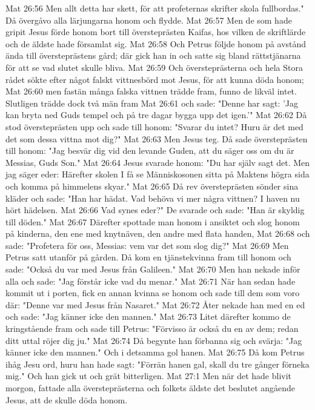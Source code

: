 Mat 26:56  Men allt detta har skett, för att profeternas skrifter skola fullbordas." Då övergåvo alla lärjungarna honom och flydde.
Mat 26:57  Men de som hade gripit Jesus förde honom bort till översteprästen Kaifas, hos vilken de skriftlärde och de äldste hade församlat sig.
Mat 26:58  Och Petrus följde honom på avstånd ända till översteprästens gård; där gick han in och satte sig bland rättstjänarna för att se vad slutet skulle bliva.
Mat 26:59  Och översteprästerna och hela Stora rådet sökte efter något falskt vittnesbörd mot Jesus, för att kunna döda honom;
Mat 26:60  men fastän många falska vittnen trädde fram, funno de likväl intet. Slutligen trädde dock två män fram
Mat 26:61  och sade: "Denne har sagt: 'Jag kan bryta ned Guds tempel och på tre dagar bygga upp det igen.'"
Mat 26:62  Då stod översteprästen upp och sade till honom: "Svarar du intet? Huru är det med det som dessa vittna mot dig?"
Mat 26:63  Men Jesus teg. Då sade översteprästen till honom: "Jag besvär dig vid den levande Guden, att du säger oss om du är Messias, Guds Son."
Mat 26:64  Jesus svarade honom: "Du har själv sagt det. Men jag säger eder: Härefter skolen I få se Människosonen sitta på Maktens högra sida och komma på himmelens skyar."
Mat 26:65  Då rev översteprästen sönder sina kläder och sade: "Han har hädat. Vad behöva vi mer några vittnen? I haven nu hört hädelsen.
Mat 26:66  Vad synes eder?" De svarade och sade: "Han är skyldig till döden."
Mat 26:67  Därefter spottade man honom i ansiktet och slog honom på kinderna, den ene med knytnäven, den andre med flata handen,
Mat 26:68  och sade: "Profetera för oss, Messias: vem var det som slog dig?"
Mat 26:69  Men Petrus satt utanför på gården. Då kom en tjänstekvinna fram till honom och sade: "Också du var med Jesus från Galileen."
Mat 26:70  Men han nekade inför alla och sade: "Jag förstår icke vad du menar."
Mat 26:71  När han sedan hade kommit ut i porten, fick en annan kvinna se honom och sade till dem som voro där: "Denne var med Jesus från Nasaret."
Mat 26:72  Åter nekade han med en ed och sade: "Jag känner icke den mannen."
Mat 26:73  Litet därefter kommo de kringstående fram och sade till Petrus: "Förvisso är också du en av dem; redan ditt uttal röjer dig ju."
Mat 26:74  Då begynte han förbanna sig och svärja: "Jag känner icke den mannen." Och i detsamma gol hanen.
Mat 26:75  Då kom Petrus ihåg Jesu ord, huru han hade sagt: "Förrän hanen gal, skall du tre gånger förneka mig." Och han gick ut och grät bitterligen.
Mat 27:1  Men när det hade blivit morgon, fattade alla översteprästerna och folkets äldste det beslutet angående Jesus, att de skulle döda honom.
